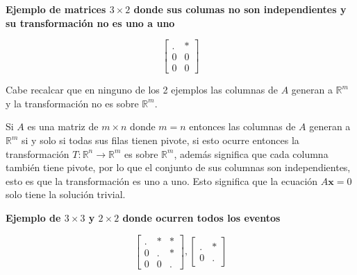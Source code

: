 \documentclass{article}
\begin{document}
\begin{tcolorbox}[colback=red!10!white, colframe=red!70!black, title=Puntos Importantes cuando $m > n$]
    \begin{large}
        \textbf{Ejemplo de matrices $3 \times 2$ donde sus columas no son independientes y su transformación no es uno a uno}
    \end{large}

    $$\begin{bmatrix}
        . & *  \\
        0 & 0 \\
        0 & 0
    \end{bmatrix}$$

Cabe recalcar que en ninguno de los 2 ejemplos las columnas de $A$ generan a $\mathbb{R}^m$ y la transformación no es sobre $\mathbb{R}^m$.
\end{tcolorbox}

\begin{tcolorbox}[colback=red!10!white, colframe=red!70!black, title=Puntos Importantes cuando $m$ = $n$ ]
    Si $A$ es una matriz de $m \times n$ donde $m = n$ entonces las columnas de $A$ generan a $\mathbb{R}^m$ si y solo si todas sus filas tienen pivote, si esto ocurre entonces la transformación $T: \mathbb{R}^n \rightarrow \mathbb{R}^m$ es sobre $\mathbb{R}^m$, además significa que cada columna también tiene pivote, por lo que el conjunto de sus columnas son independientes, esto es que la transformación es uno a uno. Esto significa que la ecuación $A\mathbf{x} = 0$ solo tiene la solución trivial.\\

    \begin{large}
        \textbf{Ejemplo de $3 \times 3$ y $2 \times 2$ donde ocurren todos los eventos}

        \begin{equation*}
            \begin{bmatrix}
                . & * & * \\
                0 & . & *\\
                0 & 0 & .
            \end{bmatrix}, 
            \begin{bmatrix}
                . & *  \\
                0 & . 
            \end{bmatrix}
        \end{equation*}

    \end{large}
\end{tcolorbox}
\end{document}
